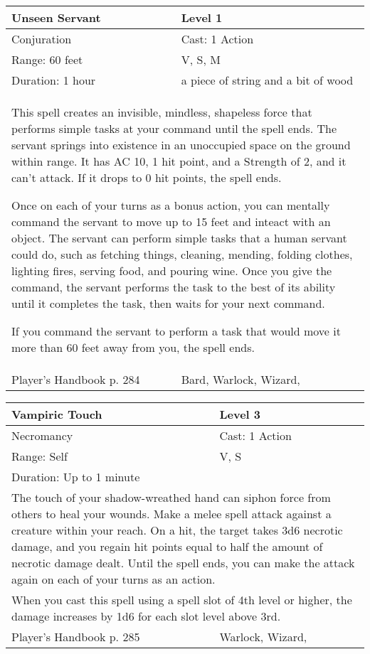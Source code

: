 \documentclass[11pt]{report}
\begin{document}
\begin{table}[H]
	\begin{tabular}{||p{6cm}|p{6cm}||}
		\hline\hline
		\bf{Unseen Servant} & Level 1\\ \hline
		Conjuration & Cast: 1 Action\\ \hline
		Range: 60 feet & V, S, M\\ \hline
		Duration: 1 hour & a piece of string and a bit of wood\\ \hline
		\multicolumn{2}{||p{12cm}||}{This spell creates an invisible, mindless, shapeless force that performs simple tasks at your command until the spell ends. The servant springs into existence in an unoccupied space on the ground within range. It has AC 10, 1 hit point, and a Strength of 2, and it can’t attack. If it drops to 0 hit points, the spell ends.

Once on each of your turns as a bonus action, you can mentally command the servant to move up to 15 feet and inteact with an object. The servant can perform simple tasks that a human servant could do, such as fetching things, cleaning, mending, folding clothes, lighting fires, serving food, and pouring wine. Once you give the command, the servant performs the task to the best of its ability until it completes the task, then waits for your next command.

If you command the servant to perform a task that would move it more than 60 feet away from you, the spell ends.}\\ \hline
Player's Handbook p. 284 & Bard, Warlock, Wizard, \\ \hline\hline
	\end{tabular}
\end{table}

\begin{table}[H]
	\begin{tabular}{||p{6cm}|p{6cm}||}
		\hline\hline
		\bf{Vampiric Touch} & Level 3\\ \hline
		Necromancy & Cast: 1 Action\\ \hline
		Range: Self & V, S\\ \hline
		Duration: Up to 1 minute & \\ \hline
		\multicolumn{2}{||p{12cm}||}{The touch of your shadow-wreathed hand can siphon force from others to heal your wounds. Make a melee spell attack against a creature within your reach. On a hit, the target takes 3d6 necrotic damage, and you regain hit points equal to half the amount of necrotic damage dealt. Until the spell ends, you can make the attack again on each of your turns as an action.}\\ \hline
		\multicolumn{2}{||p{12cm}||}{When you cast this spell using a spell slot of 4th level or higher, the damage increases by 1d6 for each slot level above 3rd.}\\ \hline
Player's Handbook p. 285 & Warlock, Wizard, \\ \hline\hline
	\end{tabular}
\end{table}
\end{document}
